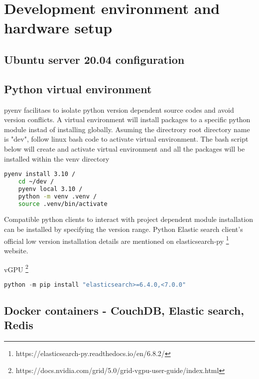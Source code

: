 \chapter{Development environment and hardware setup}

\section {Ubuntu server 20.04 configuration}

\section {Python virtual environment} \label {pyenv}

pyenv facilitaes to isolate python version dependent source codes and avoid version conflicts. A virtual environment will install packages to a specific python module instad of installing globally. Asuming the directrory root directory name is "dev", follow linux bash code to activate virtual environment. 
The bash script below will create and activate virtual environment and all the packages will be installed within the venv directory
\begin{lstlisting}[language=bash]
    pyenv install 3.10 /
    cd ~/dev /
    pyenv local 3.10 /
    python -m venv .venv /
    source .venv/bin/activate

\end{lstlisting}

Compatible python clients to interact with project dependent module installation can be installed by specifying the version range.
Python Elastic search client's official low version installation details are mentioned on elasticsearch-py \footnote{https://elasticsearch-py.readthedocs.io/en/6.8.2/} website.

vGPU \footnote{https://docs.nvidia.com/grid/5.0/grid-vgpu-user-guide/index.html}

\begin{lstlisting}[language=Python]
    python -m pip install "elasticsearch>=6.4.0,<7.0.0"
\end{lstlisting}

\section {Docker containers - CouchDB, Elastic search, Redis}